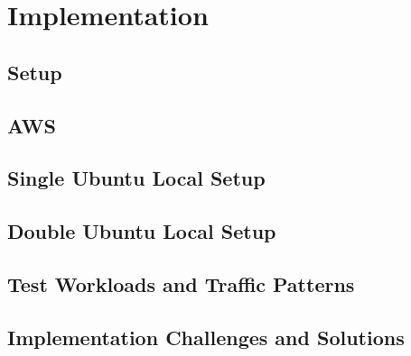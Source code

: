 \chapter{Implementation}

\section{Setup}

\section{AWS}

\section{Single Ubuntu Local Setup}

\section{Double Ubuntu Local Setup}

\section{Test Workloads and Traffic Patterns}

\section{Implementation Challenges and Solutions}